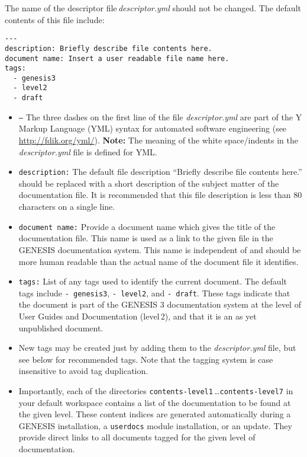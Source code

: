 \documentclass[12pt]{article}
\begin{document}
The name of the descriptor file\,{\it descriptor.yml} should not be changed. The default contents of this file include:

\begin{verbatim}
---
description: Briefly describe file contents here. 
document name: Insert a user readable file name here.  
tags:
  - genesis3
  - level2
  - draft
\end{verbatim}

\begin{itemize}

\item {\tt ---} The three dashes on the first line of the file {\it descriptor.yml} are part of the Y Markup Language (YML) syntax for automated software engineering (see \href{http://fdik.org/yml/}{http://fdik.org/yml/}). {\bf Note:} The meaning of the white space/indents in the\,{\it descriptor.yml} file is defined for YML.  

\item {\tt description:} The default file description ``Briefly describe file contents here.'' should be replaced with a short description of the subject matter of the documentation file. It is recommended that this file description is less than 80 characters on a single line.

\item {\tt document name:} Provide a document name which gives the title of the documentation file. This name is used as a link to the given file in the GENESIS documentation system. This name is independent of and should be more human readable than the actual name of the document file it identifies.

\item {\tt tags:} List of any tags used to identify the current document. The default tags include {\tt -\,genesis3}, {\tt -\,level2}, and {\tt -\,draft}. These tags indicate that the document is part of the GENESIS 3 documentation system at the level of User Guides and Documentation (level\,2), and that it is an as yet unpublished document.

\item New tags may be created just by adding them to the {\it descriptor.yml} file, but see below for recommended tags.  Note that the tagging system is case insensitive to avoid tag duplication.

\item Importantly, each of the directories {\tt contents-level1}\,\ldots {\tt contents-level7} in your default workspace contains a list of the documentation to be found at the given level. These content indices are generated automatically during a GENESIS installation, a {\tt userdocs} module installation, or an update. They provide direct links to all documents tagged for the given level of documentation.

\end{itemize}
\end{document}
